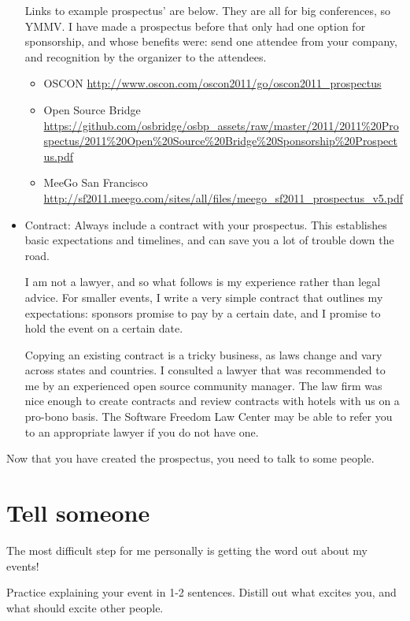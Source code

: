 \begin{itemize}
Links to example prospectus’ are below. They are all for big conferences, so YMMV. I have made a prospectus before that only had one option for sponsorship, and whose benefits were: send one attendee from your company, and recognition by the organizer to the attendees. 
\begin{itemize}
\item OSCON \url{http://www.oscon.com/oscon2011/go/oscon2011_prospectus}
\item Open Source Bridge \url{https://github.com/osbridge/osbp_assets/raw/master/2011/2011\%20Prospectus/2011\%20Open\%20Source\%20Bridge\%20Sponsorship\%20Prospectus.pdf}
\item MeeGo San Francisco \url{http://sf2011.meego.com/sites/all/files/meego_sf2011_prospectus_v5.pdf}
\end{itemize}

\item Contract:
Always include a contract with your prospectus. This establishes basic expectations and timelines, and can save you a lot of trouble down the road.

I am not a lawyer, and so what follows is my experience rather than legal advice. For smaller events, I write a very simple contract that outlines my expectations: sponsors promise to pay by a certain date, and I promise to hold the event on a certain date.

Copying an existing contract is a tricky business, as laws change and vary across states and countries. I consulted a lawyer that was recommended to me by an experienced open source community manager. The law firm was nice enough to create contracts and review contracts with hotels with us on a pro-bono basis. The Software Freedom Law Center may be able to refer you to an appropriate lawyer if you do not have one.
\end{itemize}

Now that you have created the prospectus, you need to talk to some people.

\section*{Tell someone}
The most difficult step for me personally is getting the word out about my events! 

Practice explaining your event in 1-2 sentences. Distill out what excites you, and what should excite other people.

